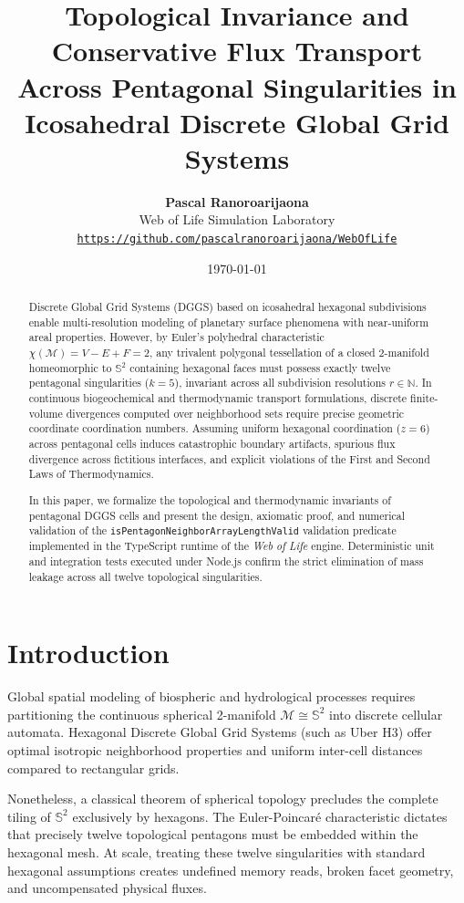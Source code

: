 \documentclass[11pt,a4paper]{article}
\title{\textbf{Topological Invariance and Conservative Flux Transport Across Pentagonal Singularities in Icosahedral Discrete Global Grid Systems}}
\author{
  \textbf{Pascal Ranoroarijaona} \\
  Web of Life Simulation Laboratory \\
  \texttt{\url{https://github.com/pascalranoroarijaona/WebOfLife}}
}
\date{\today}
\theoremstyle{definition}
\begin{document}
\maketitle

\begin{abstract}
Discrete Global Grid Systems (DGGS) based on icosahedral hexagonal subdivisions enable multi-resolution modeling of planetary surface phenomena with near-uniform areal properties. However, by Euler's polyhedral characteristic $\chi(\mathcal{M}) = V - E + F = 2$, any trivalent polygonal tessellation of a closed 2-manifold homeomorphic to $\mathbb{S}^2$ containing hexagonal faces must possess exactly twelve pentagonal singularities ($k=5$), invariant across all subdivision resolutions $r \in \mathbb{N}$. In continuous biogeochemical and thermodynamic transport formulations, discrete finite-volume divergences computed over neighborhood sets require precise geometric coordinate coordination numbers. Assuming uniform hexagonal coordination ($z=6$) across pentagonal cells induces catastrophic boundary artifacts, spurious flux divergence across fictitious interfaces, and explicit violations of the First and Second Laws of Thermodynamics. 

In this paper, we formalize the topological and thermodynamic invariants of pentagonal DGGS cells and present the design, axiomatic proof, and numerical validation of the \texttt{isPentagonNeighborArrayLengthValid} validation predicate implemented in the TypeScript runtime of the \textit{Web of Life} engine. Deterministic unit and integration tests executed under Node.js confirm the strict elimination of mass leakage across all twelve topological singularities.
\end{abstract}

\section{Introduction}
Global spatial modeling of biospheric and hydrological processes requires partitioning the continuous spherical 2-manifold $\mathcal{M} \cong \mathbb{S}^2$ into discrete cellular automata. Hexagonal Discrete Global Grid Systems (such as Uber H3) offer optimal isotropic neighborhood properties and uniform inter-cell distances compared to rectangular grids. 

Nonetheless, a classical theorem of spherical topology precludes the complete tiling of $\mathbb{S}^2$ exclusively by hexagons. The Euler-Poincar\'e characteristic dictates that precisely twelve topological pentagons must be embedded within the hexagonal mesh. At scale, treating these twelve singularities with standard hexagonal assumptions creates undefined memory reads, broken facet geometry, and uncompensated physical fluxes.
\end{document}
